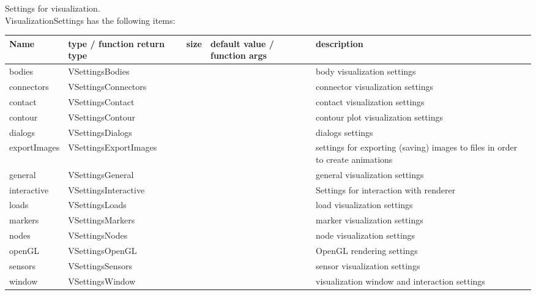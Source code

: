  \label{sec:VisualizationSettings}
Settings for visualization. \\ 
%
VisualizationSettings has the following items:
\begin{center}
  \footnotesize
  \begin{longtable}{| p{4.2cm} | p{2.5cm} | p{0.3cm} | p{3.0cm} | p{6cm} |}
    \hline
    \bf Name & \bf type / function return type & \bf size & \bf default value / function args & \bf description \\ \hline
    bodies &     VSettingsBodies &      &      &     body visualization settings\\ \hline
    connectors &     VSettingsConnectors &      &      &     connector visualization settings\\ \hline
    contact &     VSettingsContact &      &      &     contact visualization settings\\ \hline
    contour &     VSettingsContour &      &      &     contour plot visualization settings\\ \hline
    dialogs &     VSettingsDialogs &      &      &     dialogs settings\\ \hline
    exportImages &     VSettingsExportImages &      &      &     settings for exporting (saving) images to files in order to create animations\\ \hline
    general &     VSettingsGeneral &      &      &     general visualization settings\\ \hline
    interactive &     VSettingsInteractive &      &      &     Settings for interaction with renderer\\ \hline
    loads &     VSettingsLoads &      &      &     load visualization settings\\ \hline
    markers &     VSettingsMarkers &      &      &     marker visualization settings\\ \hline
    nodes &     VSettingsNodes &      &      &     node visualization settings\\ \hline
    openGL &     VSettingsOpenGL &      &      &     OpenGL rendering settings\\ \hline
    sensors &     VSettingsSensors &      &      &     sensor visualization settings\\ \hline
    window &     VSettingsWindow &      &      &     visualization window and interaction settings\\ \hline
	  \end{longtable}
	\end{center}


